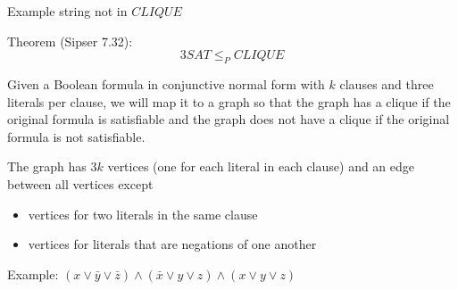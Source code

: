 \documentclass[12pt, oneside]{article}
\begin{document}
\vfill

Example  string not  in $CLIQUE$

\vfill

Theorem (Sipser 7.32):
\[
3SAT  \leq_P CLIQUE
\]

Given a Boolean formula in conjunctive normal form with $k$ clauses and three literals per clause, we will 
map it to a graph so that the graph has a clique if the original formula is satisfiable and the 
graph does not have a clique if the original formula is not satisfiable.

The graph has $3k$ vertices (one for each literal in each clause) and an edge between all vertices except
\begin{itemize}
    \item vertices for two literals in the same clause
    \item vertices for literals that are negations of one another
\end{itemize}

Example: $(x \vee \bar{y} \vee {\bar z}) \wedge (\bar{x}  \vee y  \vee  z) \wedge (x \vee y  \vee z)$

\vfill

\vfill
\vfill
\newpage
\end{document}
